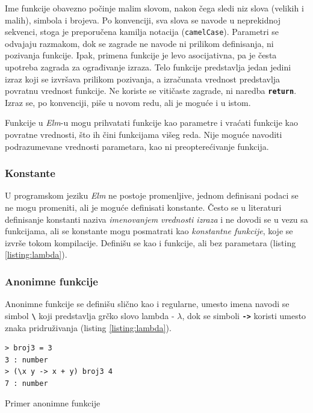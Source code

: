 \documentclass[12pt,oneside]{memoir}
\begin{document}
Ime funkcije obavezno počinje malim slovom, nakon čega sledi niz slova (velikih i malih),
simbola \texttt{\textbf{\textunderscore}} i brojeva. Po konvenciji, sva slova se navode u
neprekidnoj sekvenci, stoga je preporučena kamilja notacija (\texttt{camelCase}).
Parametri se odvajaju razmakom, dok se zagrade ne navode ni prilikom definisanja, ni
pozivanja funkcije. Ipak, primena funkcije je levo asocijativna, pa je česta upotreba
zagrada za ograđivanje izraza. Telo funkcije predstavlja jedan jedini izraz koji se izvršava
prilikom pozivanja, a izračunata vrednost predstavlja povratnu vrednost funkcije. Ne koriste
se vitičaste zagrade, ni naredba \texttt{\textbf{return}}. Izraz se, po konvenciji, piše u
novom redu, ali je moguće i u istom.

Funkcije u \emph{Elm}-u mogu prihvatati funkcije kao parametre i vraćati funkcije kao 
povratne vrednosti, što ih čini funkcijama višeg reda. Nije moguće navoditi
podrazumevane vrednosti parametara, kao ni preopterećivanje funkcija.

\subsubsection{Konstante}
U programskom jeziku \emph{Elm} ne postoje promenljive, jednom definisani podaci se ne mogu promeniti, ali je 
moguće definisati konstante. Često se u literaturi definisanje konstanti naziva 
\emph{imenovanjem vrednosti izraza} i ne dovodi se u vezu sa funkcijama, ali se konstante 
mogu posmatrati kao \emph{konstantne funkcije}, koje se izvrše tokom kompilacije. Definišu se
kao i funkcije, ali bez parametara (listing \ref{listing:lambda}).

\subsubsection{Anonimne funkcije}
Anonimne funkcije se definišu slično kao i regularne, umesto imena navodi se simbol 
\texttt{\textbf{\textbackslash}} koji predstavlja grčko slovo lambda - \(\lambda\),
dok se simboli \texttt{\textbf{->}} koristi umesto znaka pridruživanja (listing \ref{listing:lambda}).
\begin{listing}[h]
\begin{verbatim}
> broj3 = 3
3 : number
> (\x y -> x + y) broj3 4
7 : number
\end{verbatim}
\caption{Primer anonimne funkcije}
\label{listing:lambda}
\end{listing}
\end{document}
